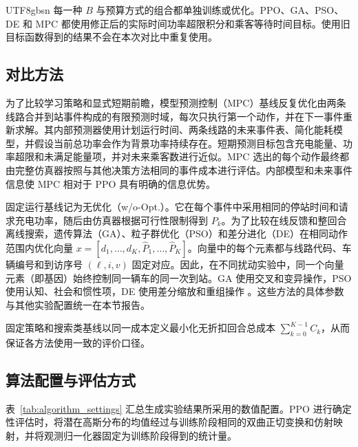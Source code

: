 \documentclass[conference]{IEEEtran}
\begin{document}
\begin{CJK*}{UTF8}{gbsn}
每一种 $B$ 与预算方式的组合都单独训练或优化。PPO、GA、PSO、DE 和 MPC 都使用修正后的实际时间功率超限积分和乘客等待时间目标。使用旧目标函数得到的结果不会在本次对比中重复使用。

\subsection{对比方法}
为了比较学习策略和显式短期前瞻，模型预测控制（MPC）基线反复优化由两条线路合并到站事件构成的有限预测时域，每次只执行第一个动作，并在下一事件重新求解。其内部预测器使用计划运行时间、两条线路的未来事件表、简化能耗模型，并假设当前总功率会作为背景功率持续存在。短期预测目标包含充电能量、功率超限和未满足能量项，并对未来乘客数进行近似。MPC 选出的每个动作最终都由完整仿真器按照与其他决策方法相同的事件成本进行评估。内部模型和未来事件信息使 MPC 相对于 PPO 具有明确的信息优势。

固定运行基线记为无优化（w/o-Opt.）。它在每个事件中采用相同的停站时间和请求充电功率，随后由仿真器根据可行性限制得到 $P_k$。为了比较在线反馈和整回合离线搜索，遗传算法（GA）、粒子群优化（PSO）和差分进化（DE）在相同动作范围内优化向量 $x=[d_1,\ldots,d_K,\widehat{P}_1,\ldots,\widehat{P}_K]$。向量中的每个元素都与线路代码、车辆编号和到访序号 $(\ell,i,v)$ 固定对应。因此，在不同扰动实验中，同一个向量元素（即基因）始终控制同一辆车的同一次到站。GA 使用交叉和变异操作，PSO 使用认知、社会和惯性项，DE 使用差分缩放和重组操作 \cite{holland1975adaptation,kennedy1995pso,storn1997de}。这些方法的具体参数与其他实验配置统一在本节报告。

固定策略和搜索类基线以同一成本定义最小化无折扣回合总成本 $\sum_{k=0}^{K-1}C_k$，从而保证各方法使用一致的评价口径。

\subsection{算法配置与评估方式}
表~\ref{tab:algorithm_settings} 汇总生成实验结果所采用的数值配置。PPO 进行确定性评估时，将潜在高斯分布的均值经过与训练阶段相同的双曲正切变换和仿射映射，并将观测归一化器固定为训练阶段得到的统计量。


\end{CJK*}
\end{document}
